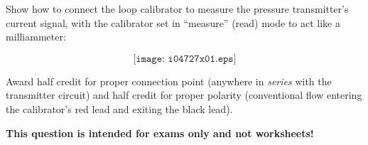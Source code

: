

Show how to connect the loop calibrator to measure the pressure transmitter's current signal, with the calibrator set in ``measure'' (read) mode to act like a milliammeter:

$$\texttt{[image: i04727x01.eps]}$$







Award half credit for proper connection point (anywhere in {\it series} with the transmitter circuit) and half credit for proper polarity (conventional flow entering the calibrator's red lead and exiting the black lead).







{\bf This question is intended for exams only and not worksheets!}




